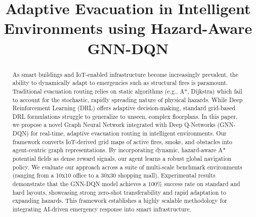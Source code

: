 \documentclass[conference]{IEEEtran}
\begin{document}
\title{Adaptive Evacuation in Intelligent Environments using Hazard-Aware GNN-DQN\\
}

\author{
\and
{}
}

\maketitle

\begin{abstract}
As smart buildings and IoT-enabled infrastructure become increasingly prevalent, the ability to dynamically adapt to emergencies such as structural fires is paramount. Traditional evacuation routing relies on static algorithms (e.g., A*, Dijkstra) which fail to account for the stochastic, rapidly spreading nature of physical hazards. While Deep Reinforcement Learning (DRL) offers adaptive decision-making, standard grid-based DRL formulations struggle to generalize to unseen, complex floorplans. In this paper, we propose a novel Graph Neural Network integrated with Deep Q-Networks (GNN-DQN) for real-time, adaptive evacuation routing in intelligent environments. Our framework converts IoT-derived grid maps of active fires, smoke, and obstacles into agent-centric graph representations. By incorporating dynamic, hazard-aware A* potential fields as dense reward signals, our agent learns a robust global navigation policy. We evaluate our approach across a suite of multi-scale benchmark environments (ranging from a 10x10 office to a 30x30 shopping mall). Experimental results demonstrate that the GNN-DQN model achieves a 100\% success rate on standard and hard layouts, showcasing strong zero-shot transferability and rapid adaptation to expanding hazards. This framework establishes a highly scalable methodology for integrating AI-driven emergency response into smart infrastructure.
\end{abstract}
\end{document}
